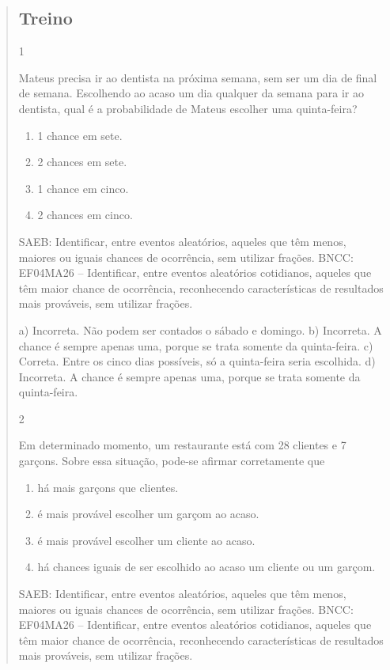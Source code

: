 \begin{mdframed}[linewidth=2pt,linecolor=salmao,roundcorner=2pt]
\begin{itemize}
{\begin{itemize}
\begin{escolha}
{\begin{quote}
{\begin{escolha}
{\subsection{Treino}

\num{1}

Mateus precisa ir ao dentista na próxima semana, sem ser um dia de final de semana. Escolhendo ao acaso um dia
qualquer da semana para ir ao dentista, qual é a probabilidade de Mateus
escolher uma quinta-feira?

\begin{enumerate}
\item
  1 chance em sete.
\item
  2 chances em sete.
\item
  1 chance em cinco.
\item
  2 chances em cinco.
\end{enumerate}

SAEB: Identificar, entre eventos aleatórios, aqueles que têm menos, maiores ou iguais chances de ocorrência, sem utilizar frações.
BNCC: EF04MA26 -- Identificar, entre eventos aleatórios cotidianos, aqueles que têm maior chance de
ocorrência, reconhecendo características de resultados mais prováveis, sem utilizar frações.

a) Incorreta. Não podem ser contados o sábado e domingo.
b) Incorreta. A chance é sempre apenas uma, porque se trata somente da quinta-feira.
c) Correta. Entre os cinco dias possíveis, só a quinta-feira seria escolhida.
d) Incorreta. A chance é sempre apenas uma, porque se trata somente da quinta-feira.

\num{2}

Em determinado momento, um restaurante está com 28 clientes e 7
garçons. Sobre essa situação, pode-se afirmar corretamente que

\begin{enumerate}
\item
  há mais garçons que clientes.
\item
  é mais provável escolher um garçom ao acaso.
\item
  é mais provável escolher um cliente ao acaso.
\item
  há chances iguais de ser escolhido ao acaso um cliente ou um garçom.
\end{enumerate}

SAEB: Identificar, entre eventos aleatórios, aqueles que têm menos, maiores ou iguais chances de ocorrência, sem utilizar frações.
BNCC: EF04MA26 -- Identificar, entre eventos aleatórios cotidianos, aqueles que têm maior chance de
ocorrência, reconhecendo características de resultados mais prováveis, sem utilizar frações.

}
\end{escolha}}
\end{quote}}
\end{escolha}
\end{itemize}}
\end{itemize}
\end{mdframed}
